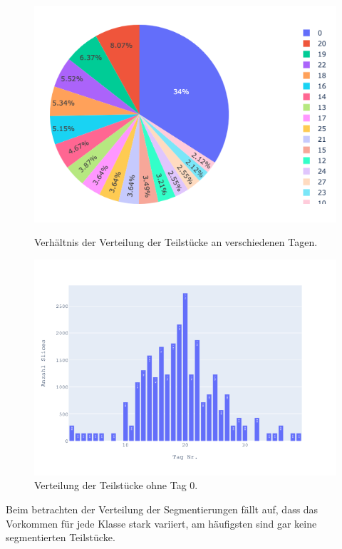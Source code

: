 \begin{figure}[H]
   \begin{minipage}{0.48\textwidth}
     \centering
		\includegraphics[width=1\linewidth]{LaTex/bilder/day_slice_pie.png}
		\caption{Verhältnis der Verteilung der Teilstücke an verschiedenen Tagen.}\label{Fig:pie-chart}
   \end{minipage}\hfill
   \begin{minipage}{0.48\textwidth}
     \centering
     \includegraphics[width=1.2\linewidth]{LaTex/bilder/day_slice.png}
     \caption{Verteilung der Teilstücke ohne Tag 0.}\label{Fig:slice_per_day}
   \end{minipage}
\end{figure}

Beim betrachten der Verteilung der Segmentierungen fällt auf, dass das Vorkommen für jede Klasse stark variiert, am häufigsten sind gar keine segmentierten Teilstücke. 

